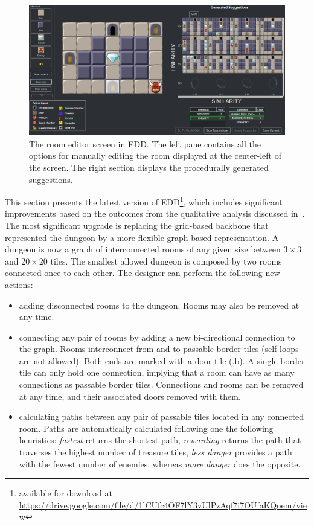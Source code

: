 \begin{figure}[t]
\centerline{\includegraphics[width=\textwidth]{figure3.png}}
\caption{The room editor screen in EDD. The left pane contains all the options for manually editing the room displayed at the center-left of the screen. The right section displays the procedurally generated suggestions.}
\label{figs:roomscreen}
\end{figure}

This section presents the latest version of EDD\footnote{available for download at \url{https://drive.google.com/file/d/1lCUfc4OF7lY3vUlPzAqf7i7OUfaKQoem/view}}, which includes significant improvements based on the outcomes from the qualitative analysis discussed in~. The most significant upgrade is replacing the grid-based backbone that represented the dungeon by a more flexible graph-based representation. A dungeon is now a graph of interconnected rooms of any given size between $3\times3$ and $20\times20$ tiles. The smallest allowed dungeon is composed by two rooms connected once to each other. The designer can perform the following new actions: 

\begin{itemize}
\item adding disconnected rooms to the dungeon. Rooms may also be removed at any time.
\item connecting any pair of rooms by adding a new bi-directional connection to the graph. Rooms interconnect from and to passable border tiles (self-loops are not allowed). Both ends are marked with a door tile (.b). A single border tile can only hold one connection, implying that a room can have as many connections as passable border tiles. Connections and rooms can be removed at any time, and their associated doors removed with them.%
\item calculating paths between any pair of passable tiles located in any connected room. Paths are automatically calculated following one the following heuristics: \textit{fastest} returns the shortest path, \textit{rewarding} returns the path that traverses the highest number of treasure tiles, \textit{less danger} provides a path with the fewest number of enemies, whereas \textit{more danger} does the opposite. 
\end{itemize}

